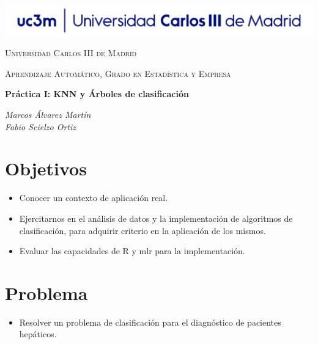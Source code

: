 \documentclass[
  11pt,
  a4paper,
]{article}
\author{}
\date{\vspace{-2.5em}}
\providecommand{\tightlist}{%
  \setlength{\itemsep}{0pt}\setlength{\parskip}{0pt}}
\begin{document}

\graphicspath{ {images/} }

\begin{center}
\centering
	\includegraphics[width=1.5\textwidth]{uc3m}\par\vspace{1cm}
{\scshape\LARGE Universidad Carlos III de Madrid \par}
	\vspace{1cm}
	{\scshape\Large Aprendizaje Automático, Grado en Estadística y Empresa \par}
	\vspace{1.5cm}
	{\huge\bfseries Práctica I: KNN y Árboles de clasificación \par}
	\vspace{2cm}
	{\Large\itshape Marcos Álvarez Martín \\ Fabio Scielzo Ortiz \par}
	\date{3 de Marzo de 2022}
	\vfill
	\vfill
\end{center}

\newpage
\tableofcontents
\newpage

\hypertarget{objetivos}{%
\section{\texorpdfstring{Objetivos }{Objetivos }}\label{objetivos}}

\begin{itemize}
\item
  Conocer un contexto de aplicación real.
\item
  Ejercitarnos en el análisis de datos y la implementación de algoritmos
  de clasificación, para adquirir criterio en la aplicación de los
  mismos.
\item
  Evaluar las capacidades de R y mlr para la implementación.
\end{itemize}

\hypertarget{problema}{%
\section{\texorpdfstring{Problema }{Problema }}\label{problema}}

\begin{itemize}
\tightlist
\item
  Resolver un problema de clasificación para el diagnóstico de pacientes
  hepáticos.
\end{itemize}
\end{document}
